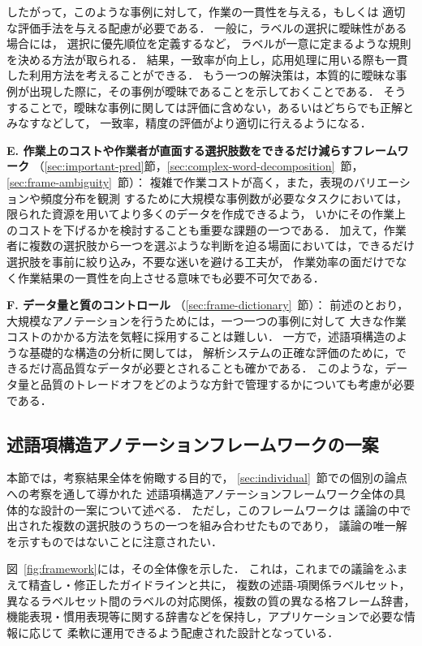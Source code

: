 \documentclass[japanese]{jnlp_1.4}
\begin{document}
したがって，このような事例に対して，作業の一貫性を与える，もしくは
適切な評価手法を与える配慮が必要である．
一般に，ラベルの選択に曖昧性がある場合には，
選択に優先順位を定義するなど，
ラベルが一意に定まるような規則を決める方法が取られる．
結果，一致率が向上し，応用処理に用いる際も一貫した利用方法を考えることができる．
もう一つの解決策は，本質的に曖昧な事例が出現した際に，その事例が曖昧であることを示しておくことである．
そうすることで，曖昧な事例に関しては評価に含めない，あるいはどちらでも正解とみなすなどして，
一致率，精度の評価がより適切に行えるようになる．


\noindent
\textbf{E. 作業上のコストや作業者が直面する選択肢数をできるだけ減らすフレームワーク}
（\ref{sec:important-pred}節，\ref{sec:complex-word-decomposition}~節，\ref{sec:frame-ambiguity}~節）： 
複雑で作業コストが高く，また，表現のバリエーションや頻度分布を観測
するために大規模な事例数が必要なタスクにおいては，
限られた資源を用いてより多くのデータを作成できるよう，
いかにその作業上のコストを下げるかを検討することも重要な課題の一つである．
加えて，作業者に複数の選択肢から一つを選ぶような判断を迫る場面においては，できるだけ選択肢を事前に絞り込み，不要な迷いを避ける工夫が，
作業効率の面だけでなく作業結果の一貫性を向上させる意味でも必要不可欠である\cite{Bayerl:2011:DIA:2077692.2077696}．


\noindent
\textbf{F. データ量と質のコントロール}
（\ref{sec:frame-dictionary}~節）： 
前述のとおり，大規模なアノテーションを行うためには，一つ一つの事例に対して
大きな作業コストのかかる方法を気軽に採用することは難しい．
一方で，述語項構造のような基礎的な構造の分析に関しては，
解析システムの正確な評価のために，できるだけ高品質なデータが必要とされることも確かである．
このような，データ量と品質のトレードオフをどのような方針で管理するかについても考慮が必要である．


\subsection{述語項構造アノテーションフレームワークの一案}
\label{sec:example-framework}
本節では，考察結果全体を俯瞰する目的で，
\ref{sec:individual}~節での個別の論点への考察を通して導かれた
述語項構造アノテーションフレームワーク全体の具体的な設計の一案について述べる．
ただし，このフレームワークは
議論の中で出された複数の選択肢のうちの一つを組み合わせたものであり，
議論の唯一解を示すものではないことに注意されたい．

図~\ref{fig:framework}には，その全体像を示した．
これは，これまでの議論をふまえて精査し・修正したガイドラインと共に，
複数の述語-項関係ラベルセット，異なるラベルセット間のラベルの対応関係，複数の質の異なる格フレーム辞書，
機能表現・慣用表現等に関する辞書などを保持し，アプリケーションで必要な情報に応じて
柔軟に運用できるよう配慮された設計となっている．
\end{document}
